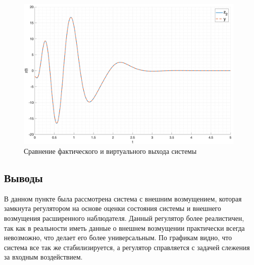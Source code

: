 \begin{figure}[ht!]
    \centering
    \includegraphics[width=\textwidth]{media/plots/task3_z2_cmp.png}
    \caption{Сравнение фактического и виртуального выхода системы}
    \label{fig:task3_z2_cmp}
\end{figure}
\FloatBarrier

\subsection{Выводы}
В данном пункте была рассмотрена система с внешним возмущением, которая замкнута 
регулятором на основе оценки состояния системы и внешнего возмущения расширенного наблюдателя.
Данный регулятор более реалистичен, так как в реальности иметь данные о внешнем возмущении практически 
всегда невозможно, что делает его более универсальным. По графикам видно, что система все 
так же стабилизируется, а регулятор справляется с задачей слежения за входным воздействием. 